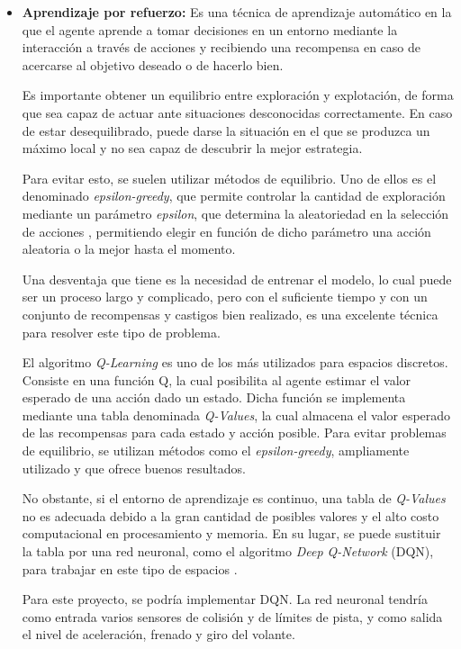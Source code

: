 \begin{itemize}
   \item \textbf{Aprendizaje por refuerzo:} Es una técnica de aprendizaje automático en la que el agente aprende a tomar decisiones en un entorno mediante la interacción a través de acciones
   y recibiendo una recompensa en caso de acercarse al objetivo deseado o de hacerlo bien. 
   
   Es importante obtener un equilibrio entre exploración y explotación, de forma que sea capaz de actuar ante situaciones desconocidas correctamente. En caso de estar desequilibrado, puede darse la situación en el que se produzca un máximo local y no sea capaz de descubrir la mejor estrategia.

   
   Para evitar esto, se suelen utilizar métodos de equilibrio. Uno de ellos es el denominado \textit{epsilon-greedy}, que permite controlar la cantidad de exploración mediante un parámetro \textit{epsilon}, que determina la aleatoriedad en la selección de acciones \cite{10.1007/978-3-642-24455-1_33}, permitiendo elegir en función de dicho parámetro una acción aleatoria o la mejor hasta el momento.

   Una desventaja que tiene es la necesidad de entrenar el modelo, lo cual puede ser un proceso largo y complicado, pero con el suficiente tiempo y con un conjunto de recompensas y castigos bien realizado, es una excelente técnica para resolver este tipo de problema.

   El algoritmo \textit{Q-Learning} es uno de los más utilizados para espacios discretos. Consiste en una función Q, la cual posibilita al agente estimar el valor esperado de una acción dado un estado. Dicha función se implementa mediante una tabla denominada \textit{Q-Values}, la cual almacena el valor esperado de las recompensas para cada estado y acción posible. Para evitar problemas de equilibrio, se utilizan métodos como el \textit{epsilon-greedy}, ampliamente utilizado y que ofrece buenos resultados.

   No obstante, si el entorno de aprendizaje es continuo, una tabla de \textit{Q-Values} no es adecuada debido a la gran cantidad de posibles valores y el alto costo computacional en procesamiento y memoria. En su lugar, se puede sustituir la tabla por una red neuronal, como el algoritmo \textit{Deep Q-Network} (DQN), para trabajar en este tipo de espacios \cite{coulom:tel-00003985}.

   Para este proyecto, se podría implementar DQN. La red neuronal tendría como entrada varios sensores de colisión y de límites de pista, y como salida el nivel de aceleración, frenado y giro del volante.


\end{itemize}
